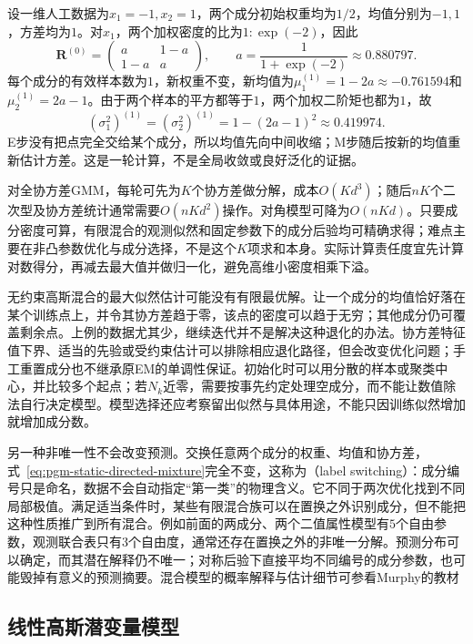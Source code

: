 \begin{example}[一轮可复核的高斯混合EM]
  \label{ex:pgm-static-directed-gmm-em}
  设一维人工数据为$x_1=-1,x_2=1$，两个成分初始权重均为$1/2$，均值分别为$-1,1$，方差均为$1$。对$x_1$，两个加权密度的比为$1:\exp(-2)$，因此
  \[
    \bm{R}^{(0)}
      =\begin{pmatrix}a&1-a\\1-a&a\end{pmatrix},
    \qquad a=\frac{1}{1+\exp(-2)}\approx0.880797.
  \]
  每个成分的有效样本数为$1$，新权重不变，新均值为$\mu_1^{(1)}=1-2a\approx-0.761594$和$\mu_2^{(1)}=2a-1$。由于两个样本的平方都等于$1$，两个加权二阶矩也都为$1$，故
  \[
    (\sigma_1^2)^{(1)}=(\sigma_2^2)^{(1)}
      =1-(2a-1)^2\approx0.419974.
  \]
  E步没有把点完全交给某个成分，所以均值先向中间收缩；M步随后按新的均值重新估计方差。这是一轮计算，不是全局收敛或良好泛化的证据。
\end{example}

对全协方差GMM，每轮可先为$K$个协方差做分解，成本$O(Kd^3)$；随后$nK$个二次型及协方差统计通常需要$O(nKd^2)$操作。对角模型可降为$O(nKd)$。只要成分密度可算，有限混合的观测似然和固定参数下的成分后验均可精确求得；难点主要在非凸参数优化与成分选择，不是这个$K$项求和本身。实际计算责任度宜先计算对数得分，再减去最大值并做归一化，避免高维小密度相乘下溢。

无约束高斯混合的最大似然估计可能没有有限最优解。让一个成分的均值恰好落在某个训练点上，并令其协方差趋于零，该点的密度可以趋于无穷；其他成分仍可覆盖剩余点。上例的数据尤其少，继续迭代并不是解决这种退化的办法。协方差特征值下界、适当的先验或受约束估计可以排除相应退化路径，但会改变优化问题；手工重置成分也不继承原EM的单调性保证。初始化时可以用分散的样本或聚类中心，并比较多个起点；若$N_k$近零，需要按事先约定处理空成分，而不能让数值除法自行决定模型。模型选择还应考察留出似然与具体用途，不能只因训练似然增加就增加成分数。

另一种非唯一性不会改变预测。交换任意两个成分的权重、均值和协方差，式~\eqref{eq:pgm-static-directed-mixture}完全不变，这称为（label switching）：成分编号只是命名，数据不会自动指定“第一类”的物理含义。它不同于两次优化找到不同局部极值。满足适当条件时，某些有限混合族可以在置换之外识别成分，但不能把这种性质推广到所有混合。例如前面的两成分、两个二值属性模型有$5$个自由参数，观测联合表只有$3$个自由度，通常还存在置换之外的非唯一分解。预测分布可以确定，而其潜在解释仍不唯一；对称后验下直接平均不同编号的成分参数，也可能毁掉有意义的预测摘要。混合模型的概率解释与估计细节可参看Murphy的教材

\subsection{线性高斯潜变量模型}
\label{sec:pgm-static-directed-linear-gaussian}

